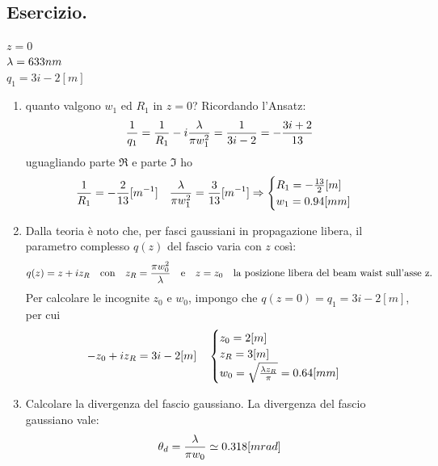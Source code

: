 \subsection{Esercizio.}
$z=0$\\
$\lambda = 633 nm$\\
$q_1 = 3i -2 [m]$\\
\begin{enumerate}
\item quanto valgono $w_1$ ed $R_1$ in $z=0$?
Ricordando l'Ansatz:
\begin{equation*}
\frac{1}{q_1} = \frac{1}{R_1} -i\frac{\lambda}{\pi w_1^2} = \frac{1}{3i - 2}= -\frac{3i + 2}{13}
\end{equation*}
uguagliando parte $\Re$ e parte $\Im$ ho
\begin{equation*}
\frac{1}{R_1} = -\frac{2}{13} [m^{-1}] \quad \frac{\lambda}{\pi w_1^2} = \frac{3}{13} [m^{-1}] \Rightarrow \begin{cases}
R_1 = -\frac{13}{2} [m]\\
w_1 = 0.94 [mm]
\end{cases}
\end{equation*}
\item Dalla teoria è noto che, per fasci gaussiani in propagazione libera, il parametro complesso $q(z)$ del fascio varia con $z$ così:
\begin{equation*}
q(z) = z + iz_R \quad \text{con} \quad z_R = \frac{\pi w_0^2}{\lambda} \quad \text{e} \quad z = z_0 \quad \text{la posizione libera del beam waist sull'asse z.}
\end{equation*}
Per calcolare le incognite $z_0$ e $w_0$, impongo che $q(z=0) = q_1 = 3i -2 [m]$, per cui
\begin{equation*}
-z_0 + iz_R = 3i -2 [m] \quad \begin{cases}
z_0 = 2 [m]\\
z_R = 3 [m]\\
w_0 = \sqrt{\frac{\lambda z_R}{\pi}} = 0.64 [mm]
\end{cases}
\end{equation*}
\item Calcolare la divergenza del fascio gaussiano.
La divergenza del fascio gaussiano vale:
\begin{equation*}
\theta_d = \frac{\lambda}{\pi w_0} \simeq 0.318 [mrad]
\end{equation*}
\end{enumerate}



